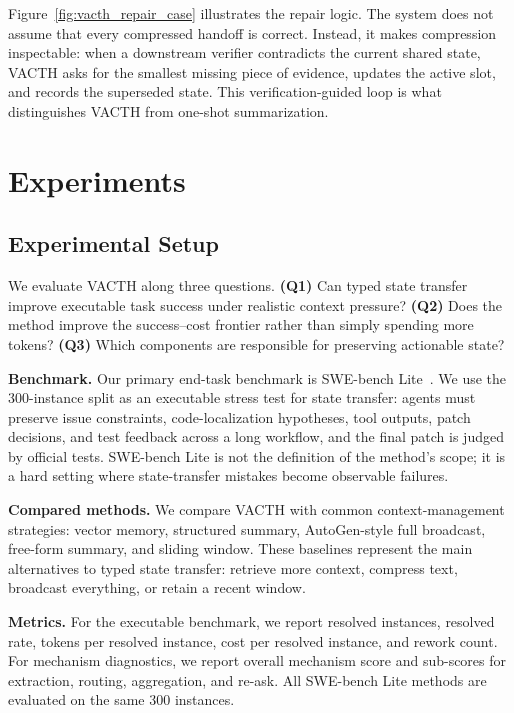 \documentclass{article} %
\begin{document}
Figure~\ref{fig:vacth_repair_case} illustrates the repair logic. The system does not assume that every compressed handoff is correct. Instead, it makes compression inspectable: when a downstream verifier contradicts the current shared state, VACTH asks for the smallest missing piece of evidence, updates the active slot, and records the superseded state. This verification-guided loop is what distinguishes VACTH from one-shot summarization.


\section{Experiments}
\label{sec:experiments}

\subsection{Experimental Setup}

We evaluate VACTH along three questions. \textbf{(Q1)} Can typed state transfer improve executable task success under realistic context pressure? \textbf{(Q2)} Does the method improve the success--cost frontier rather than simply spending more tokens? \textbf{(Q3)} Which components are responsible for preserving actionable state?

\textbf{Benchmark.}
Our primary end-task benchmark is SWE-bench Lite~\cite{jimenez2024swebench}. We use the 300-instance split as an executable stress test for state transfer: agents must preserve issue constraints, code-localization hypotheses, tool outputs, patch decisions, and test feedback across a long workflow, and the final patch is judged by official tests. SWE-bench Lite is not the definition of the method's scope; it is a hard setting where state-transfer mistakes become observable failures.

\textbf{Compared methods.}
We compare VACTH with common context-management strategies: vector memory, structured summary, AutoGen-style full broadcast, free-form summary, and sliding window. These baselines represent the main alternatives to typed state transfer: retrieve more context, compress text, broadcast everything, or retain a recent window.

\textbf{Metrics.}
For the executable benchmark, we report resolved instances, resolved rate, tokens per resolved instance, cost per resolved instance, and rework count. For mechanism diagnostics, we report overall mechanism score and sub-scores for extraction, routing, aggregation, and re-ask. All SWE-bench Lite methods are evaluated on the same 300 instances.
\end{document}
